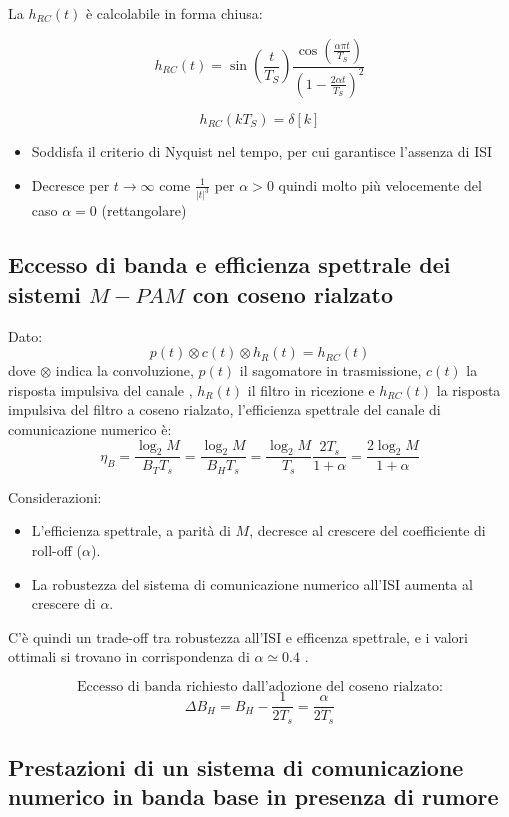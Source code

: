 La \( h_{RC}(t) \) \`e calcolabile in forma chiusa:

\[ h_{RC}(t) = \sin\left(\frac{t}{T_S}\right) \frac{\cos\left(\frac{\alpha \pi t}{T_S}\right)}{\left(1- \frac{2\alpha t}{T_S}\right)^2}  \]

\[ h_{RC}(kT_S) = \delta[k] \]

\begin{itemize}
\item Soddisfa il criterio di Nyquist nel tempo, per cui garantisce l'assenza di ISI
\item Decresce per \( t \rightarrow \infty \) come \( \frac{1}{|t|^3} \) per \( \alpha > 0 \) quindi molto pi\`u velocemente del caso \( \alpha = 0 \) (rettangolare)
\end{itemize}




\subsection*{Eccesso di banda e efficienza spettrale dei sistemi \( M-PAM \) con coseno rialzato}

Dato:
\[ p(t) \otimes c(t) \otimes h_R(t) = h_{RC}(t) \]
dove \( \otimes \) indica la convoluzione, $p(t)$ il sagomatore in trasmissione, $c(t)$ la risposta impulsiva del canale , $h_R(t)$ il filtro in ricezione e \( h_{RC}(t) \) la risposta impulsiva del filtro a coseno rialzato, l'efficienza spettrale del canale di comunicazione numerico è:
\[ \eta_{B} = \frac{\log_2M}{B_T T_s} = \frac{\log_2M}{B_H T_s} = \frac{\log_2M}{ T_s} \frac{2T_s}{1+\alpha} = \frac{2\log_2M}{1+\alpha}\]

Considerazioni:
\begin{itemize}
    \item L'efficienza spettrale, a parità di \( M \), decresce al crescere del coefficiente di roll-off (\( \alpha \)).
    \item La robustezza del sistema di comunicazione numerico all'ISI aumenta al crescere di \( \alpha \).
\end{itemize}

C'è quindi un trade-off tra robustezza all'ISI e efficenza spettrale, e i valori ottimali si trovano in corrispondenza di \( \alpha \simeq 0.4 \) .

\[ \text{Eccesso di banda richiesto dall'adozione del coseno rialzato:} \]
\[ \Delta B_{H} = B_{H} - \frac{1}{2T_s} = \frac{\alpha}{2T_s} \]



\subsection*{Prestazioni di un sistema di comunicazione numerico in banda base in presenza di rumore}

